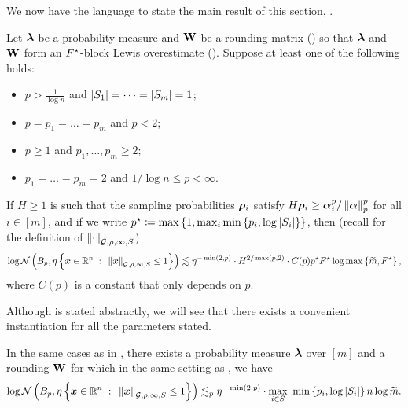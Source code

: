 \documentclass[11pt]{article}
\numberwithin{equation}{section}
\begin{document}
We now have the language to state the main result of this section, .

\begin{theorem}
\label{thm:general_covering}
Let $\bm{\lambda}$ be a probability measure and $\mathbf{W}$ be a rounding matrix () so that $\bm{\lambda}$ and $\mathbf{W}$ form an $F^{\star}$-block Lewis overestimate (). Suppose at least one of the following holds:
\begin{itemize}
    \item $p > \frac{1}{\log n}$ and $\left\lvert S_1 \right\rvert=\dots=\left\lvert S_m \right\rvert=1$;
    \item $p = p_1 = \dots = p_m$ and $p < 2$;
    \item $p \ge 1$ and $p_1,\dots,p_m \ge 2$;
    \item $p_1=\dots=p_m=2$ and $1/\log n \le p < \infty$.
\end{itemize}
If $H \ge 1$ is such that the sampling probabilities $\bm{\rho}_i$ satisfy $H\bm{\rho}_i \ge \bm{\alpha}_i^p/\left\lVert \bm{\alpha} \right\rVert_p^p$ for all $i \in [m]$, and if we write $p^{\star}\coloneqq\max\left\{1,\max_{i}\min\left\{p_i,\log\left\lvert S_i \right\rvert\right\}\right\}$, then (recall  for the definition of $\left\lVert \cdot \right\rVert_{\mathcal{G},\rho,\infty, S}$)
\begin{align*}
    \log\mathcal{N}\left(B_p, \eta\left\{\bm{x}\in\mathbb{R}^n {\;\; : \;\;} \left\lVert \bm{x} \right\rVert_{\mathcal{G},\rho,\infty, S} \le 1\right\}\right) \lesssim \eta^{-\min(2,p)} \cdot H^{2/\max(p,2)}\cdot C(p)p^{\star}F^{\star}\log\max\left\{\widetilde{m},F^{\star}\right\},
\end{align*}
where $C(p)$ is a constant that only depends on $p$.
\end{theorem}

Although  is stated abstractly, we will see that there exists a convenient instantiation for all the parameters stated.

\begin{corollary}
\label{corollary:specific_cover}
In the same cases as in , there exists a probability measure $\bm{\lambda}$ over $[m]$ and a rounding $\mathbf{W}$ for which in the same setting as , we have
\begin{align*}
    \log\mathcal{N}\left(B_p, \eta\left\{\bm{x}\in\mathbb{R}^n {\;\; : \;\;} \left\lVert \bm{x} \right\rVert_{\mathcal{G},\rho,\infty, S} \le 1\right\}\right) \lesssim_p \eta^{-\min(2,p)}\cdot{\underset{i \in S}{\max}\ \min\left\{p_i,\log\ensuremath{\left\lvert S_i \right\rvert}\right\}n\log\widetilde{m}}.
\end{align*}
\end{corollary}
\end{document}
